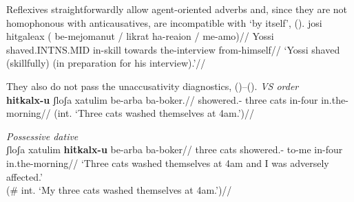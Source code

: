 {%
%
%
%

Reflexives straightforwardly allow agent-oriented adverbs and, since they are not homophonous with anticausatives, are incompatible with `by itself', (\nextx).
\ex
	\begingl
		\gla josi hitgaleax ({\cmark} be-mejomanut / {\cmark} likrat ha-reaion / {\xmark} me-a{\texttslig}mo)//
		\gla Yossi shaved.INTNS.MID {} in-skill {} {} towards the-interview {} {} from-himself//
		\glft `Yossi shaved (skillfully) (in preparation for his interview).'//
	\endgl
\xe

They also do not pass the unaccusativity diagnostics, (\nextx)--(\anextx).
\ex \textit{VS order}\\
	\begingl
	\gla \ljudge{\#}\textbf{hitkalx-u} ʃloʃa xatulim be-arba ba-boker.//
	\glb showered.- three cats in-four in.the-morning//
	\glft (int. `Three cats washed themselves at 4am.')//
	\endgl
\xe

\ex \textit{Possessive dative}\\
	\begingl 
	\gla \ljudge{\#}ʃloʃa xatulim \textbf{hitkalx-u}  be-arba ba-boker//
	\glb three cats showered.- to-me in-four in.the-morning//
	\glft `Three cats washed themselves at 4am and I was adversely affected.'\\
		(\# int. `My three cats washed themselves at 4am.')//
	\endgl
\xe

}
